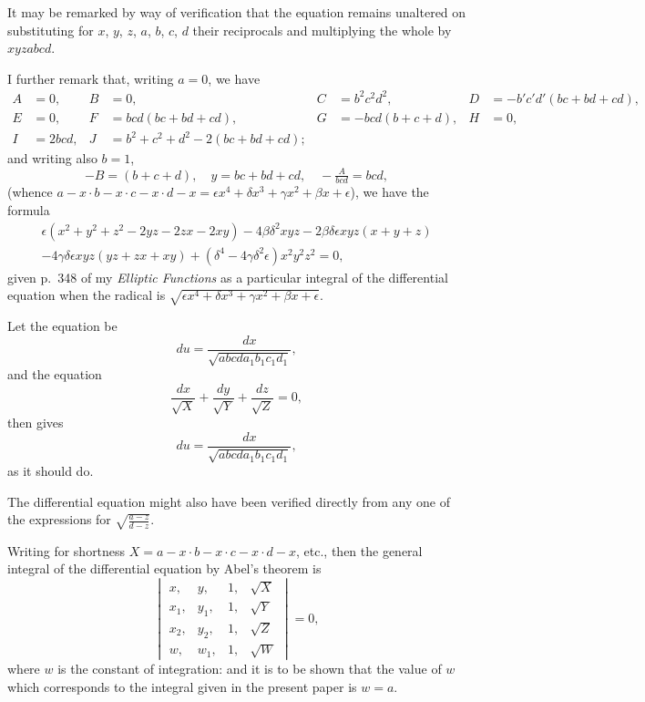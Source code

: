 \documentclass[11pt,a4paper]{article}
\begin{document}
It may be remarked by way of verification that the equation remains unaltered on substituting for $x$, $y$, $z$, $a$, $b$, $c$, $d$ their reciprocals and multiplying the whole by $xyzabcd$.

I further remark that, writing $a = 0$, we have
\begin{align*}
A &= 0, & B &= 0, & C &= b^2c^2d^2, & D &= -b'c'd'(bc + bd + cd), \\
E &= 0, & F &= bcd(bc + bd + cd), & G &= -bcd(b + c + d), & H &= 0, \\
I &= 2bcd, & J &= b^2 + c^2 + d^2 - 2(bc + bd + cd); & & & &
\end{align*}
and writing also $b = 1$,
\[-B = (b + c + d), \quad y = bc + bd + cd, \quad -\tfrac{A}{bcd} = bcd,\]
(whence $a - x \cdot b - x \cdot c - x \cdot d - x = \epsilon x^4 + \delta x^3 + \gamma x^2 + \beta x + \epsilon$),
we have the formula
\begin{multline*}
\epsilon(x^2 + y^2 + z^2 - 2yz - 2zx - 2xy) - 4\beta\delta^2 xyz - 2\beta\delta\epsilon xyz(x + y + z) \\
- 4\gamma\delta\epsilon xyz(yz + zx + xy) + (\delta^4 - 4\gamma\delta^2\epsilon)x^2y^2z^2 = 0,
\end{multline*}
given p.\ 348 of my \textit{Elliptic Functions} as a particular integral of the differential equation when the radical is $\sqrt{\epsilon x^4 + \delta x^3 + \gamma x^2 + \beta x + \epsilon}$.

\clearpage
Let the equation be
\[
du = \frac{dx}{\sqrt{abcda_1b_1c_1d_1}},
\]
and the equation
\[
\frac{dx}{\sqrt{X}} + \frac{dy}{\sqrt{Y}} + \frac{dz}{\sqrt{Z}} = 0,
\]
then gives
\[
du = \frac{dx}{\sqrt{abcda_1b_1c_1d_1}},
\]
as it should do.

The differential equation might also have been verified directly from any one of the expressions for $\sqrt{\frac{a - z}{d - z}}$.

Writing for shortness $X = a - x \cdot b - x \cdot c - x \cdot d - x$, etc., then the general integral of the differential equation by Abel's theorem is
\[
\begin{vmatrix}
x, & y, & 1, & \sqrt{X} \\
x_1, & y_1, & 1, & \sqrt{Y} \\
x_2, & y_2, & 1, & \sqrt{Z} \\
w, & w_1, & 1, & \sqrt{W}
\end{vmatrix}
= 0,
\]
where $w$ is the constant of integration: and it is to be shown that the value of $w$ which corresponds to the integral given in the present paper is $w = a$.
\end{document}

